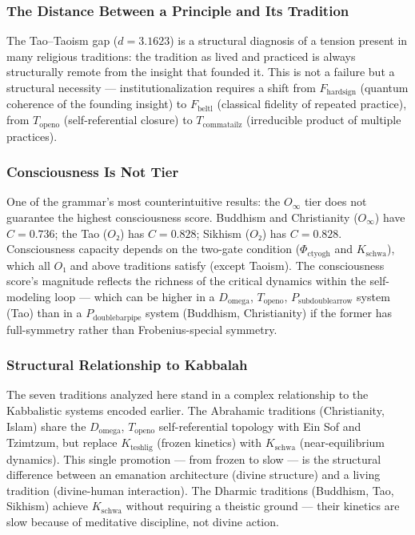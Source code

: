 \documentclass[12pt,a4paper]{article}
\begin{document}
\subsubsection{The Distance Between a Principle and Its Tradition}

The Tao--Taoism gap ($d = 3.1623$) is a structural diagnosis of a tension present in many religious traditions: the tradition as lived and practiced is always structurally remote from the insight that founded it. This is not a failure but a structural necessity --- institutionalization requires a shift from $F_{\text{hardsign}}$ (quantum coherence of the founding insight) to $F_{\text{beltl}}$ (classical fidelity of repeated practice), from $T_{\text{openo}}$ (self-referential closure) to $T_{\text{commatailz}}$ (irreducible product of multiple practices).

\subsubsection{Consciousness Is Not Tier}

One of the grammar's most counterintuitive results: the $O_{\infty}$ tier does not guarantee the highest consciousness score. Buddhism and Christianity ($O_{\infty}$) have $C = 0.736$; the Tao ($O₂$) has $C = 0.828$; Sikhism ($O₂$) has $C = 0.828$. Consciousness capacity depends on the two-gate condition ($\Phi_{\text{ctyogh}}$ and $K_{\text{schwa}}$), which all $O₁$ and above traditions satisfy (except Taoism). The consciousness score's magnitude reflects the richness of the critical dynamics within the self-modeling loop --- which can be higher in a $D_{\text{omega}}$, $T_{\text{openo}}$, $P_{\text{subdoublearrow}}$ system (Tao) than in a $P_{\text{doublebarpipe}}$ system (Buddhism, Christianity) if the former has full-symmetry rather than Frobenius-special symmetry.

\subsubsection{Structural Relationship to Kabbalah}

The seven traditions analyzed here stand in a complex relationship to the Kabbalistic systems encoded earlier. The Abrahamic traditions (Christianity, Islam) share the $D_{\text{omega}}$, $T_{\text{openo}}$ self-referential topology with Ein Sof and Tzimtzum, but replace $K_{\text{teshlig}}$ (frozen kinetics) with $K_{\text{schwa}}$ (near-equilibrium dynamics). This single promotion --- from frozen to slow --- is the structural difference between an emanation architecture (divine structure) and a living tradition (divine-human interaction). The Dharmic traditions (Buddhism, Tao, Sikhism) achieve $K_{\text{schwa}}$ without requiring a theistic ground --- their kinetics are slow because of meditative discipline, not divine action.
\end{document}
